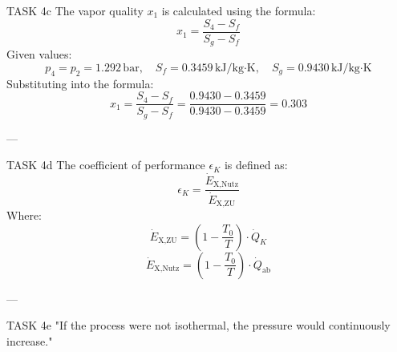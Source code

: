 TASK 4c  
The vapor quality \( x_1 \) is calculated using the formula:  
\[
x_1 = \frac{S_4 - S_f}{S_g - S_f}
\]  
Given values:  
\[
p_4 = p_2 = 1.292 \, \text{bar}, \quad S_f = 0.3459 \, \text{kJ/kg·K}, \quad S_g = 0.9430 \, \text{kJ/kg·K}
\]  
Substituting into the formula:  
\[
x_1 = \frac{S_4 - S_f}{S_g - S_f} = \frac{0.9430 - 0.3459}{0.9430 - 0.3459} = 0.303
\]  

---

TASK 4d  
The coefficient of performance \( \epsilon_K \) is defined as:  
\[
\epsilon_K = \frac{\dot{E}_{\text{X,Nutz}}}{\dot{E}_{\text{X,ZU}}}
\]  
Where:  
\[
\dot{E}_{\text{X,ZU}} = \left( 1 - \frac{T_0}{T} \right) \cdot \dot{Q}_K
\]  
\[
\dot{E}_{\text{X,Nutz}} = \left( 1 - \frac{T_0}{T} \right) \cdot \dot{Q}_{\text{ab}}
\]  

---

TASK 4e  
"If the process were not isothermal, the pressure would continuously increase."